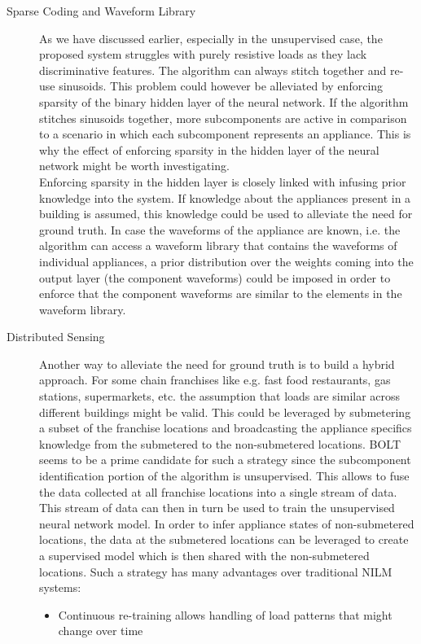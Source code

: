 \begin{description}
\item[Sparse Coding and Waveform Library] As we have discussed earlier, especially in the unsupervised case, the proposed system struggles with purely resistive loads as they lack discriminative features. The algorithm can always stitch together and re-use sinusoids. This problem could however be alleviated by enforcing sparsity of the binary hidden layer of the neural network. If the algorithm stitches sinusoids together, more subcomponents are active in comparison to a scenario in which each subcomponent represents an appliance. This is why the effect of enforcing sparsity in the hidden layer of the neural network might be worth investigating.\\
Enforcing sparsity in the hidden layer is closely linked with infusing prior knowledge into the system. If knowledge about the appliances present in a building is assumed, this knowledge could be used to alleviate the need for ground truth. In case the waveforms of the appliance are known, i.e. the algorithm can access a waveform library that contains the waveforms of individual appliances, a prior distribution over the weights coming into the output layer (the component waveforms) could be imposed in order to enforce that the component waveforms are similar to the elements in the waveform library.
\item[Distributed Sensing] Another way to alleviate the need for ground truth is to build a hybrid approach. For some chain franchises like e.g. fast food restaurants, gas stations, supermarkets, etc. the assumption that loads are similar across different buildings might be valid. This could be leveraged by submetering a subset of the franchise locations and broadcasting the appliance specifics knowledge from the submetered to the non-submetered locations. BOLT seems to be a prime candidate for such a strategy since the subcomponent identification portion of the algorithm is unsupervised. This allows to fuse the data collected at all franchise locations into a single stream of data. This stream of data can then in turn be used to train the unsupervised neural network model. In order to infer appliance states of non-submetered locations, the data at the submetered locations can be leveraged to create a supervised model which is then shared with the non-submetered locations. Such a strategy has many advantages over traditional NILM systems: 
\begin{itemize}
\item Continuous re-training allows handling of load patterns that might change over time

\end{itemize}
\end{description}
